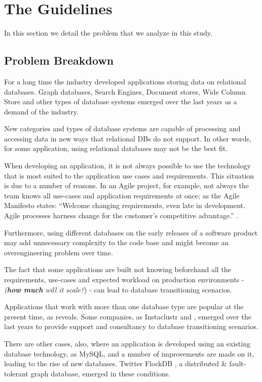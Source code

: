 \chapter{The Guidelines}\label{theProblemChap}
In this section we detail the problem that we analyze in this study.

\section{Problem Breakdown}

For a long time the industry developed applications storing data on relational databases. Graph databases, Search Engines, Document stores, Wide Column Store and other types of database systems emerged over the last years as a demand of the industry. 

New categories and types of database systems are capable of processing and accessing data in new ways that relational DBs do not support. In other words, for some application, using relational databases may not be the best fit. 

When developing an application, it is not always possible to use the technology that is most suited to the application use cases and requirements. This situation is due to a number of reasons. In an Agile project, for example, not always the team knows all use-cases and application requirements at once; as the Agile Manifesto states: ``Welcome changing requirements, even late in 
development. Agile processes harness change for 
the customer's competitive advantage.'' \cite{fowler2001agile}. 

Furthermore, using different databases on the early releases of a software product may add unnecessary complexity to the code base and might become an overengineering problem over time. 

The fact that some applications are built not knowing beforehand all the requirements, use-cases and expected workload on production environments - \textit{(\textbf{how much} will it scale?}) - can lead to database transitioning scenarios.

Applications that work with more than one database type are popular at the present time, as \cite{sadalage2012nosql} reveals. Some companies, as Instaclustr \cite{instaclustr} and \cite{elastic}, emerged over the last years to provide support and consultancy to database transitioning scenarios.

There are other cases, also, where an application is developed using an existing database technology, as MySQL, and a number of improvements are made on it, leading to the rise of new databases. Twitter FlockDB \cite{flockdb}, a distributed \& fault-tolerant graph database, emerged in these conditions. 


